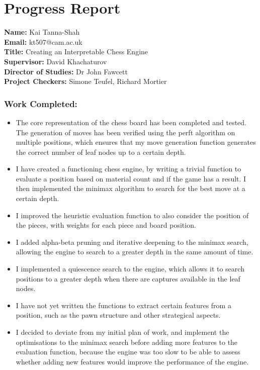 \documentclass[12pt,a4paper]{article}
\begin{document}
\part*{Progress Report}

\textbf{Name:} Kai Tanna-Shah\\
\textbf{Email:} kt507@cam.ac.uk\\
\textbf{Title:} Creating an Interpretable Chess Engine\\
\textbf{Supervisor:} David Khachaturov\\
\textbf{Director of Studies:} Dr John Fawcett\\
\textbf{Project Checkers:} Simone Teufel, Richard Mortier

\section*{Work Completed:}
\begin{itemize}
    \item The core representation of the chess board has been completed and tested. The generation of moves has been verified using the perft algorithm on multiple positions, which ensures that my move generation function generates the correct number of leaf nodes up to a certain depth.
    \item I have created a functioning chess engine, by writing a trivial function to evaluate a position based on material count and if the game has a result. I then implemented the minimax algorithm to search for the best move at a certain depth.
    \item I improved the heuristic evaluation function to also consider the position of the pieces, with weights for each piece and board position.
    \item I added alpha-beta pruning and iterative deepening to the minimax search, allowing the engine to search to a greater depth in the same amount of time.
    \item I implemented a quiescence search to the engine, which allows it to search positions to a greater depth when there are captures available in the leaf nodes.
    \item I have not yet written the functions to extract certain features from a position, such as the pawn structure and other strategical aspects.
    \item I decided to deviate from my initial plan of work, and implement the optimisations to the minimax search before adding more features to the evaluation function, because the engine was too slow to be able to assess whether adding new features would improve the performance of the engine. 
\end{itemize}
\end{document}
